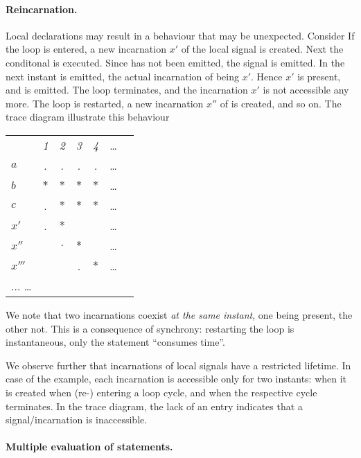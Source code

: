 \paragraph{Reincarnation.}

Local declarations may result in a behaviour that may be unexpected. Consider
%
%
If the loop is entered, a new incarnation
$x'$ of the local signal 
is created. Next the conditonal is executed. Since  has not been emitted, the signal  is emitted. In the next instant  is emitted, 
the actual incarnation of  being $x'$. Hence $x'$ is present,
and  is emitted. The loop terminates, and the incarnation $x'$ is
not accessible any more. The loop is restarted, a new incarnation $x''$ of  is created, and so on. The trace diagram illustrate this behaviour
\begin{center}
  \leavevmode
  \begin{tabular}[]{l@{\quad}||@{\quad} cccccc}
    \hline\hline
     &{\footnotesize \textit{1}}&{\footnotesize \textit{2}}
     &{\footnotesize \textit{3}}&{\footnotesize \textit{4}}&\ldots
   \\  
    \hbox{$a$} &.&.&.&.&\ldots
   \\ 
   \hbox{$b$} &$*$&$*$&$*$&$*$&\ldots
   \\
   \hbox{$c$} &.&$*$&$*$&$*$&\ldots
   \\
   \hbox{$x'$} &.&$*$&&&\ldots
   \\
   \hbox{$x''$} &&$.$&$*$&&\ldots
   \\
   \hbox{$x'''$} &&&.&$*$&\ldots
   \\
   \hbox{$\ldots$} \ldots
   \\   \hline\hline
  \end{tabular}
\end{center}
We note that two incarnations coexist \emph{at the same instant}, one being present, the other not. This is a consequence of synchrony: restarting the 
loop is instantaneous, only the  statement ``consumes time''.

We observe further that incarnations of local signals have a restricted 
lifetime. In case of the example, each incarnation is accessible only for two instants: when it is created when (re-) entering a loop cycle, and when 
the respective cycle terminates. In the trace diagram, the lack of an entry indicates that a signal/incarnation is inaccessible. 

\paragraph{Multiple evaluation of statements.}

